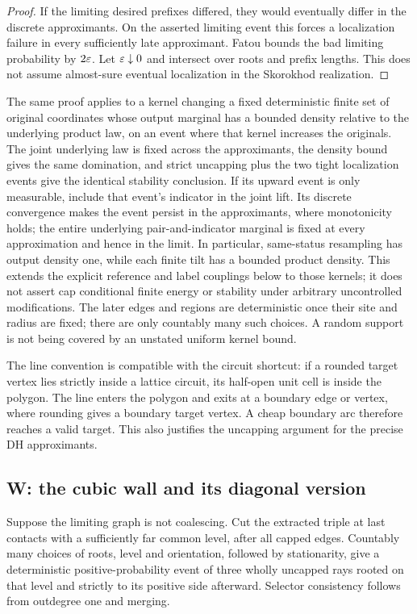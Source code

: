 \begin{proof}
If the limiting desired prefixes differed, they would eventually differ
in the discrete approximants. On the asserted limiting event this forces
a localization failure in every sufficiently late approximant. Fatou bounds
the bad limiting probability by $2\varepsilon$. Let $\varepsilon\downarrow0$ and intersect
over roots and prefix lengths. This does not assume almost-sure eventual
localization in the Skorokhod realization.
\end{proof}

\begin{remark}\label{rem:kernels}
The same proof applies to a kernel changing a fixed deterministic finite
set of original coordinates whose
output marginal has a bounded density relative to the underlying product
law, on an event where that kernel increases the originals. The joint
underlying law is fixed across the approximants, the density bound gives
the same domination, and strict uncapping plus the two tight localization
events give the identical stability conclusion. If its upward event is
only measurable, include that event's indicator in the joint lift. Its
discrete convergence makes the event persist in the approximants, where
monotonicity holds; the entire underlying pair-and-indicator marginal is
fixed at every approximation and hence in the limit. In particular,
same-status resampling has output density one, while each finite tilt has
a bounded product density. This extends the explicit reference and label
couplings below to those kernels; it does not assert cap conditional finite
energy or stability under arbitrary uncontrolled modifications. The later
edges and regions are deterministic once their site and radius are fixed;
there are only countably many such choices. A random support is not being
covered by an unstated uniform kernel bound.
\end{remark}

The line convention is compatible with the circuit shortcut: if a rounded
target vertex lies strictly inside a lattice circuit, its half-open unit
cell is inside the polygon. The line enters the polygon and exits at a
boundary edge or vertex, where rounding gives a boundary target vertex.
A cheap boundary arc therefore reaches a valid target. This also justifies
the uncapping argument for the precise DH approximants.

\subsection{W: the cubic wall and its diagonal version}\label{sec:wall}
Suppose the limiting graph is not coalescing. Cut the extracted triple at
last contacts with a sufficiently far common level, after all capped edges.
Countably many choices of roots, level and orientation, followed by
stationarity, give a deterministic positive-probability event of three
wholly uncapped rays rooted on that level and strictly to its positive side
afterward. Selector consistency follows from outdegree one and merging.

